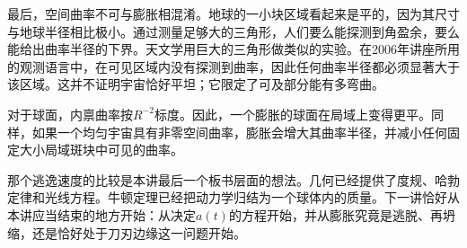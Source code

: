 最后，空间曲率不可与膨胀相混淆。地球的一小块区域看起来是平的，因为其尺寸与地球半径相比极小。通过测量足够大的三角形，人们要么能探测到角盈余，要么能给出曲率半径的下界。天文学用巨大的三角形做类似的实验。在2006年讲座所用的观测语言中，在可见区域内没有探测到曲率，因此任何曲率半径都必须显著大于该区域。这并不证明宇宙恰好平坦；它限定了可及部分能有多弯曲。

对于球面，内禀曲率按\(R^{-2}\)标度。因此，一个膨胀的球面在局域上变得更平。同样，如果一个均匀宇宙具有非零空间曲率，膨胀会增大其曲率半径，并减小任何固定大小局域斑块中可见的曲率。

\begin{classroomqa}
\end{classroomqa}

那个逃逸速度的比较是本讲最后一个板书层面的想法。几何已经提供了度规、哈勃定律和光线方程。牛顿定理已经把动力学归结为一个球体内的质量。下一讲恰好从本讲应当结束的地方开始：从决定\(a(t)\)的方程开始，并从膨胀究竟是逃脱、再坍缩，还是恰好处于刀刃边缘这一问题开始。
